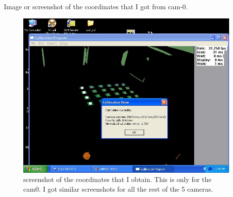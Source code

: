 \documentclass{article}
\begin{document}
\begin{enumerate}
\newpage
Image or screenshot of the coordinates that I got from cam-0.
\begin{figure}[!htb]
    \centering
  		\includegraphics[scale=0.6]{cam0.JPG}
  		\caption{screenshot of the coordinates that I obtain. This is only for the cam0. I got similar screenshots for all the rest of the 5 cameras.}
  		\label{Fig7}
 \end{figure}


\end{enumerate}
\end{document}
